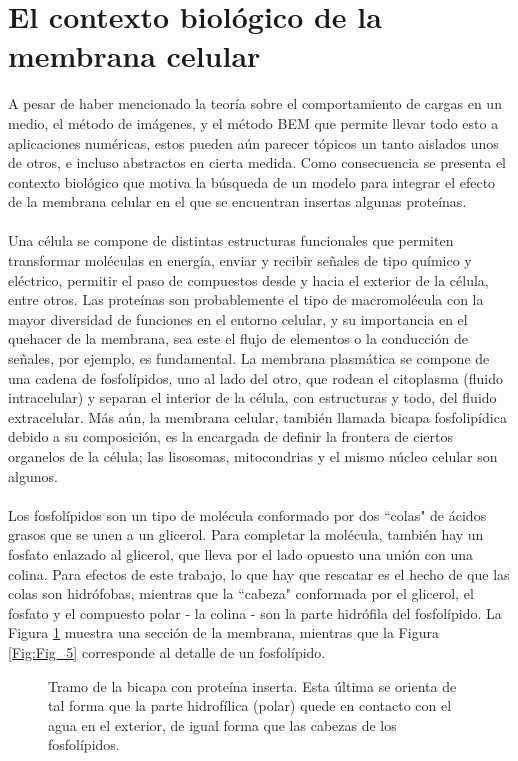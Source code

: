 \documentclass[12pt, oneside, numbers, spanish]{ezthesis}
\numberwithin{equation}{section}
\begin{document}
\section{El contexto biológico de la membrana celular}\label{Sec:Cell_Bio}
A pesar de haber mencionado la teoría sobre el comportamiento de cargas en un medio, el método de imágenes, y el método BEM que permite llevar todo esto a aplicaciones numéricas, estos pueden aún parecer tópicos un tanto aislados unos de otros, e incluso abstractos en cierta medida. Como consecuencia se presenta el contexto biológico que motiva la búsqueda de un modelo para integrar el efecto de la membrana celular en el que se encuentran insertas algunas proteínas.\\\\
Una célula se compone de distintas estructuras funcionales que permiten transformar moléculas en energía, enviar y recibir señales de tipo químico y eléctrico, permitir el paso de compuestos desde y hacia el exterior de la célula, entre otros. Las proteínas son probablemente el tipo de macromolécula con la mayor diversidad de funciones en el entorno celular, y su importancia en el quehacer de la membrana, sea este el flujo de elementos o la conducción de señales, por ejemplo, es fundamental. La membrana plasmática se compone de una cadena de fosfolípidos, uno al lado del otro, que rodean el citoplasma (fluido intracelular) y separan el interior de la célula, con estructuras y todo, del fluido extracelular. Más aún, la membrana celular, también llamada bicapa fosfolipídica debido a su composición, es la encargada de definir la frontera de ciertos organelos de la célula; las lisosomas, mitocondrias y el mismo núcleo celular son algunos.\\\\
Los fosfolípidos son un tipo de molécula conformado por dos ``colas" de ácidos grasos que se unen a un glicerol. Para completar la molécula, también hay un fosfato enlazado al glicerol, que lleva por el lado opuesto una unión con una colina. Para efectos de este trabajo, lo que hay que rescatar es el hecho de que las colas son hidrófobas, mientras que la ``cabeza" conformada por el glicerol, el fosfato y el compuesto polar - la colina - son la parte hidrófila del fosfolípido. La Figura \ref{Fig:Fig_5-2} muestra una sección de la membrana, mientras que la Figura \ref{Fig:Fig_5} corresponde al detalle de un fosfolípido.
\begin{figure}[h]
	\centering
	
	\caption{Tramo de la bicapa con proteína inserta. Esta última se orienta de tal forma que la parte hidrofílica (polar) quede en contacto con el agua en el exterior, de igual forma que las cabezas de los fosfolípidos.} \label{Fig:Fig_5-2}
\end{figure}
\end{document}
